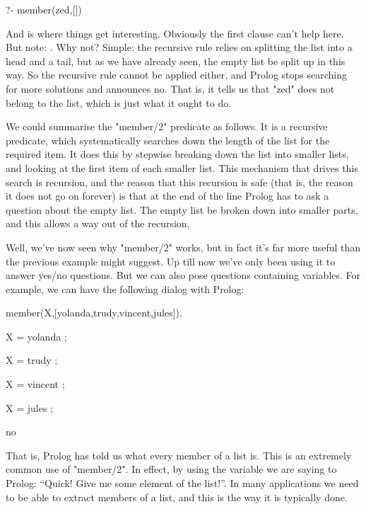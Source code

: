 \begin{LPNcodedisplay}
?- member(zed,[])
\end{LPNcodedisplay}
And  is where things get interesting.  Obviously the
first clause can't help here.  But note: .  Why not? Simple: the recursive rule
relies on splitting the list into a head and a tail, but as we have
already seen, the empty list  be split up in this way.
So the recursive rule cannot be applied either, and Prolog stops
searching for more solutions and announces no.  That is, it tells us
that "zed" does not belong to the list, which is just what it ought to
do.

We could summarise the "member/2" predicate as follows.  It
is a recursive predicate, which systematically searches down the
length of the list for the required item.  It does this by stepwise
breaking down the list into smaller lists, and looking at the first
item of each smaller list.  This mechanism that drives this
search is recursion, and the reason that this recursion is safe (that
is, the reason it does not go on forever) is that at the end of the
line Prolog has to ask a question about the empty list.  The empty
list  be broken down into smaller parts, and this allows a
way out of the recursion.

Well, we've now seen why "member/2" works, but in fact it's
far more useful than the previous example might suggest.  Up till now
we've only been using it to answer yes/no questions.  But we can also
pose questions containing variables.  For example, we can have the
following dialog with Prolog:


\begin{LPNcodedisplay}
member(X,[yolanda,trudy,vincent,jules]).

X = yolanda ;

X = trudy ;

X = vincent ;

X = jules ;

no
\end{LPNcodedisplay}


That is, Prolog has told us what every member of a list is.  This is
an extremely common use of "member/2". In effect, by using the
variable we are saying to Prolog: ``Quick! Give me some element of the
list!''. In many applications we need to be able to extract members of
a list, and this is the way it is typically done.




